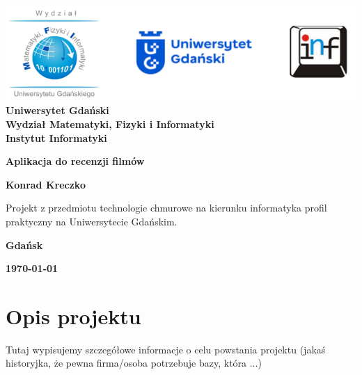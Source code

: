 \documentclass[12pt,a4paper]{article}
\newcommand{\hmwkTitle}{Aplikacja do recenzji filmów} %
\newcommand{\hmwkDueDate}{\today} %
\newcommand{\hmwkAuthorName}{Konrad Kreczko} %
\begin{document}
\begin{titlepage}
    \vfill
	\begin{center}
	\hspace*{-1cm}
	\vspace*{0.5cm}
    \includegraphics[scale=0.55]{imagens/loga.png}\\
	\textbf{Uniwersytet Gdański \\ [0.05cm]Wydział Matematyki, Fizyki i Informatyki \\ [0.05cm] Instytut Informatyki}

	\vspace{0.6cm}
	\vspace{4cm}
	{\huge \textbf{\hmwkTitle}}\vspace{8mm}
	
	{\large \textbf{\hmwkAuthorName}}\\[3cm]
	
		\hspace{.45\textwidth} %
	   \begin{minipage}{.5\textwidth}
	   Projekt z przedmiotu technologie chmurowe na kierunku informatyka profil praktyczny na Uniwersytecie Gdańskim.\\[0.1cm]
	  \end{minipage}
	  \vfill
	
	\textbf{Gdańsk}
	
	\textbf{\hmwkDueDate}
	\end{center}
	
\end{titlepage}

\newpage
\setcounter{secnumdepth}{5}
\tableofcontents
\newpage

\section{Opis projektu}
\label{sec:Project}

Tutaj wypisujemy szczegółowe informacje o celu powstania projektu (jakaś historyjka, że pewna firma/osoba potrzebuje bazy, która ...)
\end{document}
